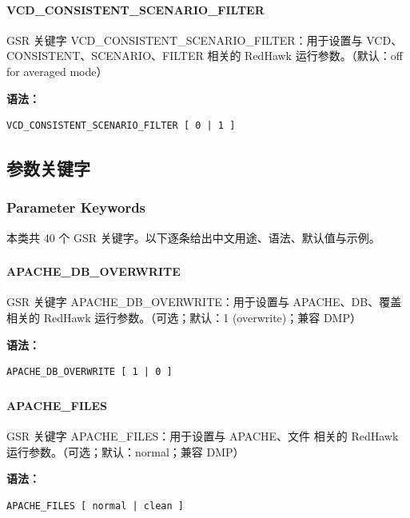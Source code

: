 \paragraph*{VCD_CONSISTENT_SCENARIO_FILTER}

GSR 关键字 VCD_CONSISTENT_SCENARIO_FILTER：用于设置与 VCD、CONSISTENT、SCENARIO、FILTER 相关的 RedHawk 运行参数。（默认：off for averaged mode）

\textbf{语法：}
\begin{lstlisting}
VCD_CONSISTENT_SCENARIO_FILTER [ 0 | 1 ]
\end{lstlisting}

\subsection{参数关键字}
\subsubsection*{Parameter Keywords}

本类共 40 个 GSR 关键字。以下逐条给出中文用途、语法、默认值与示例。

\subsubsection{}
\paragraph*{APACHE_DB_OVERWRITE}

GSR 关键字 APACHE_DB_OVERWRITE：用于设置与 APACHE、DB、覆盖 相关的 RedHawk 运行参数。（可选；默认：1 (overwrite)；兼容 DMP）

\textbf{语法：}
\begin{lstlisting}
APACHE_DB_OVERWRITE [ 1 | 0 ]
\end{lstlisting}

\subsubsection{}
\paragraph*{APACHE_FILES}

GSR 关键字 APACHE_FILES：用于设置与 APACHE、文件 相关的 RedHawk 运行参数。（可选；默认：normal；兼容 DMP）

\textbf{语法：}
\begin{lstlisting}
APACHE_FILES [ normal | clean ]
\end{lstlisting}

